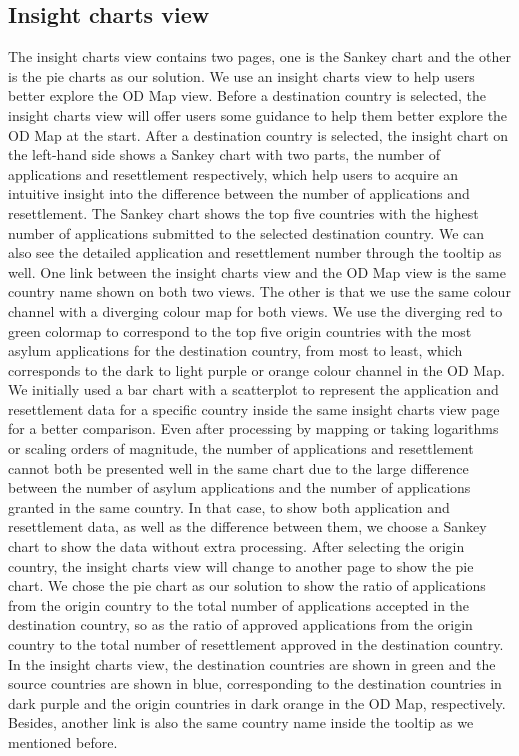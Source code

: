 \documentclass[journal]{vgtc}                %
\begin{document}
 \subsection{Insight charts view}
 The insight charts view contains two pages, one is the Sankey chart and the other is the pie charts as our solution. We use an insight charts view to help users better explore the OD Map view. Before a destination country is selected, the insight charts view will offer users some guidance to help them better explore the OD Map at the start.
 After a destination country is selected, the insight chart on the left-hand side shows a Sankey chart with two parts, the number of applications and resettlement respectively, which help users to acquire an intuitive insight into the difference between the number of applications and resettlement.
 The Sankey chart shows the top five countries with the highest number of applications submitted to the selected destination country. We can also see the detailed application and resettlement number through the tooltip as well. One link between the insight charts view and the OD Map view is the same country name shown on both two views. The other is that we use the same colour channel with a diverging colour map for both views. We use the diverging red to green colormap to correspond to the top five origin countries with the most asylum applications for the destination country, from most to least, which corresponds to the dark to light purple or orange colour channel in the OD Map.
 We initially used a bar chart with a scatterplot to represent the application and resettlement data for a specific country inside the same insight charts view page for a better comparison. Even after processing by mapping or taking logarithms or scaling orders of magnitude, the number of applications and resettlement cannot both be presented well in the same chart due to the large difference between the number of asylum applications and the number of applications granted in the same country. In that case, to show both application and resettlement data, as well as the difference between them, we choose a Sankey chart to show the data without extra processing.
 After selecting the origin country, the insight charts view will change to another page to show the pie chart. We chose the pie chart as our solution to show the ratio of applications from the origin country to the total number of applications accepted in the destination country, so as the ratio of approved applications from the origin country to the total number of resettlement approved in the destination country. In the insight charts view, the destination countries are shown in green and the source countries are shown in blue, corresponding to the destination countries in dark purple and the origin countries in dark orange in the OD Map, respectively. Besides, another link is also the same country name inside the tooltip as we mentioned before.
\end{document}
